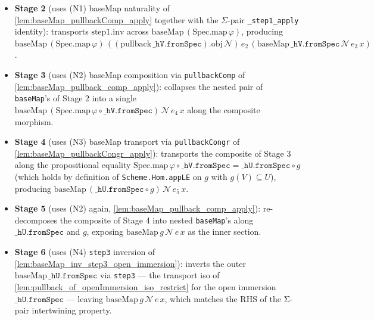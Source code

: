 \begin{definition}
\begin{itemize}
      \texttt{inv\_hom\_id}): rewrites
      \((\text{step2}.\mathrm{inv}.\mathrm{app}\,\top)\bigl(\text{tilde.toOpen}\,TR\,\top\,(1 \otimes x)\bigr)\)
      as
      \(\text{baseMap}\,(\text{Spec.map}\,\varphi)\,(\widetilde{\Gamma(\mathcal N, V)})\,e_1\,(\text{tilde.toOpen}\,\Gamma(\mathcal N, V)\,\top\,x)\).
    \item \textbf{Stage 2} (uses (N1) baseMap naturality of
      \cref{lem:baseMap_pullbackComp_apply} together with the
      \(\Sigma\)-pair \texttt{\_step1\_apply} identity): transports
      \(\text{step1}.\mathrm{inv}\) across
      \(\text{baseMap}\,(\text{Spec.map}\,\varphi)\), producing
      \(\text{baseMap}\,(\text{Spec.map}\,\varphi)\,((\text{pullback}\,\mathtt{\_hV.fromSpec}).\mathrm{obj}\,\mathcal N)\,e_2\,(\text{baseMap}\,\mathtt{\_hV.fromSpec}\,\mathcal N\,e_3\,x)\).
    \item \textbf{Stage 3} (uses (N2) baseMap composition via
      \texttt{pullbackComp} of
      \cref{lem:baseMap_pullback_comp_apply}): collapses the nested
      pair of \texttt{baseMap}'s of Stage 2 into a single
      \(\text{baseMap}\,(\text{Spec.map}\,\varphi \circ \mathtt{\_hV.fromSpec})\,\mathcal N\,e_4\,x\)
      along the composite morphism.
    \item \textbf{Stage 4} (uses (N3) baseMap transport via
      \texttt{pullbackCongr} of
      \cref{lem:baseMap_pullbackCongr_apply}): transports the
      composite of Stage 3 along the propositional equality
      \(\text{Spec.map}\,\varphi \circ \mathtt{\_hV.fromSpec}
      = \mathtt{\_hU.fromSpec} \circ g\) (which holds by definition of
      \texttt{Scheme.Hom.appLE} on \(g\) with \(g(V) \subseteq U\)),
      producing
      \(\text{baseMap}\,(\mathtt{\_hU.fromSpec} \circ g)\,\mathcal N\,e_5\,x\).
    \item \textbf{Stage 5} (uses (N2) again,
      \cref{lem:baseMap_pullback_comp_apply}): re-decomposes the
      composite of Stage 4 into nested \texttt{baseMap}'s along
      \(\mathtt{\_hU.fromSpec}\) and \(g\), exposing
      \(\text{baseMap}\,g\,\mathcal N\,e\,x\) as the inner section.
    \item \textbf{Stage 6} (uses (N4) \texttt{step3} inversion of
      \cref{lem:baseMap_inv_step3_open_immersion}): inverts the outer
      \(\text{baseMap}\,\mathtt{\_hU.fromSpec}\) via \texttt{step3} —
      the transport iso of
      \cref{lem:pullback_of_openImmersion_iso_restrict} for the open
      immersion \(\mathtt{\_hU.fromSpec}\) — leaving
      \(\text{baseMap}\,g\,\mathcal N\,e\,x\), which matches the RHS
      of the Σ-pair intertwining property.
  \end{itemize}
\end{definition}

